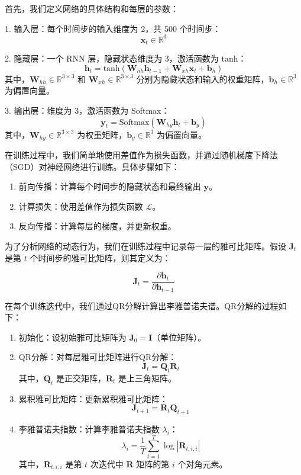 \documentclass[12pt,a4paper]{amsart}
\begin{document}
首先，我们定义网络的具体结构和每层的参数：

1. 输入层：每个时间步的输入维度为 2，共 500 个时间步：
   \[
   \mathbf{x}_t \in \mathbb{R}^{3}
   \]

2. 隐藏层：一个 RNN 层，隐藏状态维度为 3，激活函数为 tanh：
   \[
   \mathbf{h}_t = \text{tanh}(\mathbf{W}_{hh} \mathbf{h}_{t-1} + \mathbf{W}_{xh} \mathbf{x}_t + \mathbf{b}_h)
   \]
   其中，\(\mathbf{W}_{hh} \in \mathbb{R}^{3 \times 3}\) 和 \(\mathbf{W}_{xh} \in \mathbb{R}^{3 \times 3}\) 分别为隐藏状态和输入的权重矩阵，\(\mathbf{b}_h \in \mathbb{R}^{3}\) 为偏置向量。

3. 输出层：维度为 3，激活函数为 Softmax：
   \[
   \mathbf{y}_t = \text{Softmax}(\mathbf{W}_{hy} \mathbf{h}_t + \mathbf{b}_y)
   \]
   其中，\(\mathbf{W}_{hy} \in \mathbb{R}^{3 \times 3}\) 为权重矩阵，\(\mathbf{b}_y \in \mathbb{R}^{3}\) 为偏置向量。

在训练过程中，我们简单地使用差值作为损失函数，并通过随机梯度下降法（SGD）对神经网络进行训练。具体步骤如下：

\begin{enumerate}
   \item 前向传播：计算每个时间步的隐藏状态和最终输出 \(\mathbf{y}\)。
   \item 计算损失：使用差值作为损失函数 \(\mathcal{L}\)。
   \item 反向传播：计算每层的梯度，并更新权重。
\end{enumerate}

为了分析网络的动态行为，我们在训练过程中记录每一层的雅可比矩阵。假设 \(\mathbf{J}_t\) 是第 \(t\) 个时间步的雅可比矩阵，则其定义为：

\[
\mathbf{J}_t = \frac{\partial \mathbf{h}_t}{\partial \mathbf{h}_{t-1}}
\]

在每个训练迭代中，我们通过QR分解计算出李雅普诺夫谱。QR分解的过程如下：

\begin{enumerate}


\item 初始化：设初始雅可比矩阵为 \(\mathbf{J}_0 = \mathbf{I}\)（单位矩阵）。
\item QR分解：对每层雅可比矩阵进行QR分解：
   \[
   \mathbf{J}_t = \mathbf{Q}_t \mathbf{R}_t
   \]
   其中，\(\mathbf{Q}_t\) 是正交矩阵，\(\mathbf{R}_t\) 是上三角矩阵。
\item 累积雅可比矩阵：更新累积雅可比矩阵：
   \[
   \mathbf{J}_{t+1} = \mathbf{R}_t \mathbf{Q}_{t+1}
   \]
\item 李雅普诺夫指数：计算李雅普诺夫指数 \(\lambda_i\)：
   \[
   \lambda_i = \frac{1}{T} \sum_{t=1}^T \log |\mathbf{R}_{t,i,i}|
   \]
   其中，\(\mathbf{R}_{t,i,i}\) 是第 \(t\) 次迭代中 \(\mathbf{R}\) 矩阵的第 \(i\) 个对角元素。

\end{enumerate}
\end{document}
